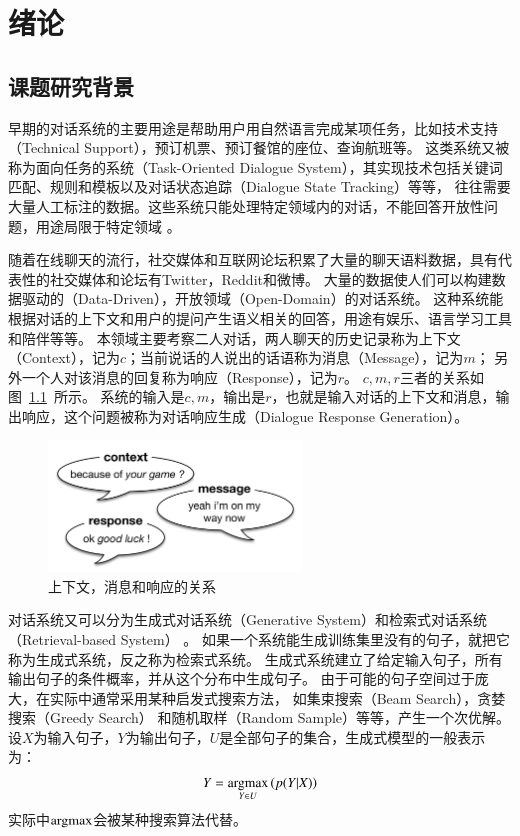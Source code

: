 
\chapter{绪论}\label{ch:introduction}

\section{课题研究背景}\label{sec:research_background}
早期的对话系统的主要用途是帮助用户用自然语言完成某项任务，比如技术支持（Technical Support），预订机票、预订餐馆的座位、查询航班等。
这类系统又被称为面向任务的系统（Task-Oriented Dialogue System），其实现技术包括关键词匹配、规则和模板以及对话状态追踪（Dialogue State Tracking）等等，
往往需要大量人工标注的数据。这些系统只能处理特定领域内的对话，不能回答开放性问题，用途局限于特定领域
。

随着在线聊天的流行，社交媒体和互联网论坛积累了大量的聊天语料数据，具有代表性的社交媒体和论坛有Twitter，Reddit和微博。
大量的数据使人们可以构建数据驱动的（Data-Driven），开放领域（Open-Domain）的对话系统。
这种系统能根据对话的上下文和用户的提问产生语义相关的回答，用途有娱乐、语言学习工具和陪伴等等。
本领域主要考察二人对话，两人聊天的历史记录称为上下文（Context），记为$c$；当前说话的人说出的话语称为消息（Message），记为$m$；
另外一个人对该消息的回复称为响应（Response），记为$r$。
$c,m,r$三者的关系如图~\ref{fig:context_message_response}~所示。
系统的输入是$c, m$，输出是$r$，也就是输入对话的上下文和消息，输出响应，这个问题被称为对话响应生成（Dialogue Response Generation）。

\begin{figure}[H]
    \includegraphics[width=0.6\textwidth]{figure/context_message_response.png}
    \centering
    \caption{上下文，消息和响应的关系}
    \label{fig:context_message_response}
\end{figure}

对话系统又可以分为生成式对话系统（Generative System）和检索式对话系统（Retrieval-based System）
。
如果一个系统能生成训练集里没有的句子，就把它称为生成式系统，反之称为检索式系统。
生成式系统建立了给定输入句子，所有输出句子的条件概率，并从这个分布中生成句子。
由于可能的句子空间过于庞大，在实际中通常采用某种启发式搜索方法，
如集束搜索（Beam Search），贪婪搜索（Greedy Search）
和随机取样（Random Sample）等等，产生一个次优解。
设$X$为输入句子，$Y$为输出句子，$U$是全部句子的集合，生成式模型的一般表示为：
\begin{align}
    Y = \operatorname*{argmax}_{Y\in U} \left(p(Y|X)\right)
\end{align}
实际中$\operatorname*{argmax}$会被某种搜索算法代替。

